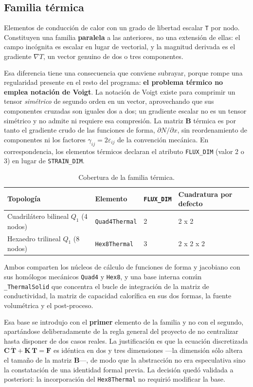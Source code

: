 \documentclass[11pt,oneside]{report}
\begin{document}
\subsection{Familia térmica}

Elementos de conducción de calor con un grado de libertad escalar \texttt{T} por nodo. Constituyen una familia \textbf{paralela} a las anteriores, no una extensión de ellas: el campo incógnita es escalar en lugar de vectorial, y la magnitud derivada es el gradiente $\nabla T$, un vector genuino de dos o tres componentes.

Esa diferencia tiene una consecuencia que conviene subrayar, porque rompe una regularidad presente en el resto del programa: \textbf{el problema térmico no emplea notación de Voigt}. La notación de Voigt existe para comprimir un tensor \textit{simétrico} de segundo orden en un vector, aprovechando que sus componentes cruzadas son iguales dos a dos; un gradiente escalar no es un tensor simétrico y no admite ni requiere esa compresión. La matriz $\mathbf B$ térmica es por tanto el gradiente crudo de las funciones de forma, $\partial N/\partial x$, sin reordenamiento de componentes ni los factores $\gamma_{ij} = 2\varepsilon_{ij}$ de la convención mecánica. En correspondencia, los elementos térmicos declaran el atributo \texttt{FLUX\_DIM} (valor 2 o 3) en lugar de \texttt{STRAIN\_DIM}.

\begin{table}[h]
\centering
\caption{Cobertura de la familia térmica.}
\begin{tabularx}{\textwidth}{YYYY}
\hline
\textbf{Topología} & \textbf{Elemento} & \textbf{\texttt{FLUX\_DIM}} & \textbf{Cuadratura por defecto} \\
\hline
Cuadrilátero bilineal $Q_1$ (4 nodos) & \texttt{Quad4Thermal} & 2 & 2 x 2 \\
Hexaedro trilineal $Q_1$ (8 nodos) & \texttt{Hex8Thermal} & 3 & 2 x 2 x 2 \\
\hline
\end{tabularx}
\end{table}
Ambos comparten los núcleos de cálculo de funciones de forma y jacobiano con sus homólogos mecánicos \texttt{Quad4} y \texttt{Hex8}, y una base interna común \texttt{\_ThermalSolid} que concentra el bucle de integración de la matriz de conductividad, la matriz de capacidad calorífica en sus dos formas, la fuente volumétrica y el post-proceso.

Esa base se introdujo con el \textbf{primer} elemento de la familia y no con el segundo, apartándose deliberadamente de la regla general del proyecto de no centralizar hasta disponer de dos casos reales. La justificación es que la ecuación discretizada $\mathbf C\,\dot{\mathbf T} + \mathbf K\,\mathbf T = \mathbf F$ es idéntica en dos y tres dimensiones ---la dimensión sólo altera el tamaño de la matriz $\mathbf B$---, de modo que la abstracción no era especulativa sino la constatación de una identidad formal previa. La decisión quedó validada a posteriori: la incorporación del \texttt{Hex8Thermal} no requirió modificar la base.
\end{document}
